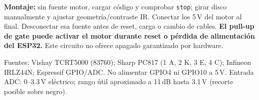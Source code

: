 \documentclass[a4paper,landscape,10pt]{article}
\begin{document}
\vspace{-2mm}
\noindent\textbf{Montaje:} sin fuente motor, cargar código y comprobar \texttt{stop}; girar disco manualmente y ajustar geometría/contraste IR. Conectar los 5\,V del motor al final. Desconectar esa fuente antes de reset, carga o cambio de cables. \textbf{El pull-up de gate puede activar el motor durante reset o pérdida de alimentación del ESP32.} Este circuito no ofrece apagado garantizado por hardware.\par\smallskip
\noindent\footnotesize Fuentes: Vishay TCRT5000 (83760); Sharp PC817 (1 A, 2 K, 3 E, 4 C); Infineon IRLZ44N; Espressif GPIO/ADC. No alimentar GPIO4 ni GPIO10 a 5\,V. Entrada ADC: 0--3.3\,V eléctrico; rango útil aproximado a 11\,dB hasta 3.1\,V (recorte posible sobre negro).
\end{document}
